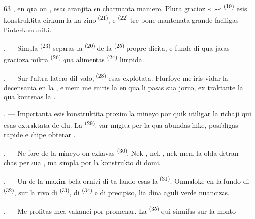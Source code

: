 \begin{VUpage}[65]{63}
\VUcontinue
{}, en qua on , esas\nl
aranjita en charmanta maniero. Plura gracioz\nl
«  »-i \textsuperscript{(19)} esis konstruktita cirkum la ka\cc
zino \textsuperscript{(21)}, e  \textsuperscript{(22)} tre bone mantenata\nl
grande faciligas l'interkomuniki.

. --- Simpla  \textsuperscript{(23)} separas la  \textsuperscript{(20)}\nl
de la  \textsuperscript{(25)} propre dicita, e funde di qua\nl
jacas gracioza mikra  \textsuperscript{(26)} qua alimentas\nl
{} \textsuperscript{(24)} limpida.

. --- Sur l'altra latero dil valo, \cc
{} \textsuperscript{(28)} esas explotata. Plurfoye me iris vidar\nl
la  decensanta en la , e mem me\nl
eniris la  en qua li pasas sua jorno, ex\cc
traktante la  qua kontenas la .

. --- Importanta  esis konstruktita\nl
proxim la mineyo por quik utiligar la richaji\nl
qui esas extraktata de olu. La  \textsuperscript{(29)}, var\cc
migita per la  qua abundas hike,\nl
posibligas rapide e chipe obtenar .

. --- Ne fore de la mineyo on exkavas\nl
{} \textsuperscript{(30)}. Nek , nek ,\nl
nek mem  la olda  detran\cc
chas per sua , ma simpla  por\nl
la konstrukto di domi.

. --- Un de la maxim bela ornivi di ta\nl
lando esas la  \textsuperscript{(31)}. Omnaloke en la fundo\nl
di  \textsuperscript{(32)}, sur la rivo di  \textsuperscript{(33)}, di\nl
{} \textsuperscript{(34)} o di precipiso, lia dina aguli verde\nl
nuancizas.

\VUsaut{3.0mm}
\VUsaut{3.0mm}

. --- Me profitas mea vakanci por \nl
promenar. La  \textsuperscript{(35)} qui sinuifas sur la monto
\parplein
\end{VUpage}

